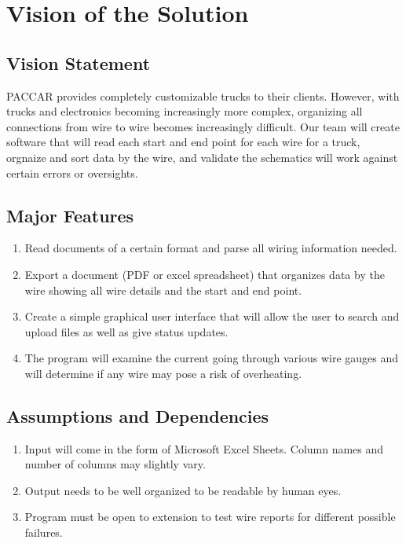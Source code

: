 \section{Vision of the Solution}
\subsection{Vision Statement}
    PACCAR provides completely customizable trucks to their clients. However, with trucks and electronics becoming increasingly more complex, organizing all connections from wire to wire becomes increasingly difficult. Our team will create software that will read each start and end point for each wire for a truck, orgnaize and sort data by the wire, and validate the schematics will work against certain errors or oversights.  

\subsection{Major Features}
\begin{enumerate}
    \item Read documents of a certain format and parse all wiring information needed.
    \item Export a document (PDF or excel spreadsheet) that organizes data by the wire showing all wire details and the start and end point.
    \item Create a simple graphical user interface that will allow the user to search and upload files as well as give status updates.
    \item The program will examine the current going through various wire gauges and will determine if any wire may pose a risk of overheating.
\end{enumerate}

\subsection{Assumptions and Dependencies}  
\begin{enumerate}
    \item Input will come in the form of Microsoft Excel Sheets. Column names and number of columns may slightly vary. 
    \item Output needs to be well organized to be readable by human eyes. 
    \item Program must be open to extension to test wire reports for different possible failures.
\end{enumerate}



